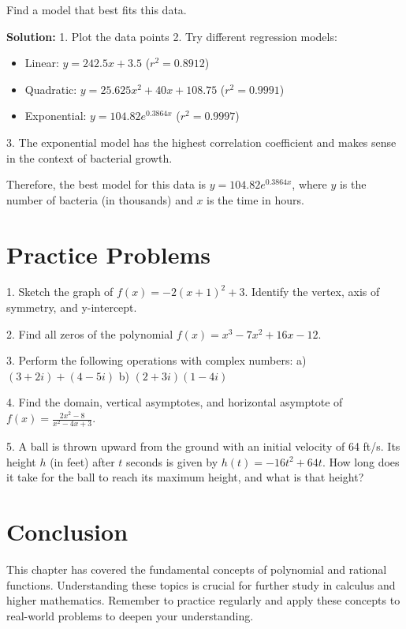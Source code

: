 \documentclass[12pt]{article}
\begin{document}
Find a model that best fits this data.

\textbf{Solution:}
1. Plot the data points
2. Try different regression models:
   \begin{itemize}
       \item Linear: $y = 242.5x + 3.5$ ($r^2 = 0.8912$)
       \item Quadratic: $y = 25.625x^2 + 40x + 108.75$ ($r^2 = 0.9991$)
       \item Exponential: $y = 104.82e^{0.3864x}$ ($r^2 = 0.9997$)
   \end{itemize}
3. The exponential model has the highest correlation coefficient and makes sense in the context of bacterial growth.

Therefore, the best model for this data is $y = 104.82e^{0.3864x}$, where $y$ is the number of bacteria (in thousands) and $x$ is the time in hours.

\section{Practice Problems}

1. Sketch the graph of $f(x) = -2(x+1)^2 + 3$. Identify the vertex, axis of symmetry, and y-intercept.

2. Find all zeros of the polynomial $f(x) = x^3 - 7x^2 + 16x - 12$.

3. Perform the following operations with complex numbers:
   a) $(3+2i) + (4-5i)$
   b) $(2+3i)(1-4i)$

4. Find the domain, vertical asymptotes, and horizontal asymptote of $f(x) = \frac{2x^2-8}{x^2-4x+3}$.

5. A ball is thrown upward from the ground with an initial velocity of 64 ft/s. Its height $h$ (in feet) after $t$ seconds is given by $h(t) = -16t^2 + 64t$. How long does it take for the ball to reach its maximum height, and what is that height?

\section{Conclusion}

This chapter has covered the fundamental concepts of polynomial and rational functions. Understanding these topics is crucial for further study in calculus and higher mathematics. Remember to practice regularly and apply these concepts to real-world problems to deepen your understanding.
\end{document}
